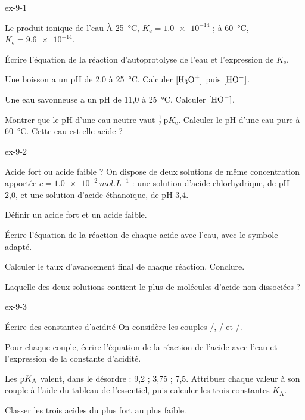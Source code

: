 \begin{blocLivre}{ex-9-1}
\begin{exercice}[1]{Le produit ionique de l'eau}
À 25~°C, $K_\mathrm{e}=\num{1.0e-14}$ ; à 60~°C, $K_\mathrm{e}=\num{9.6e-14}$.
\begin{questions}
\item Écrire l'équation de la réaction d'autoprotolyse de l'eau et l'expression de $K_\mathrm{e}$.
\item Une boisson a un pH de 2,0 à 25~°C. Calculer $[\ce{H3O+}]$ puis $[\ce{HO-}]$.
\item Une eau savonneuse a un pH de 11,0 à 25~°C. Calculer $[\ce{HO-}]$.
\item Montrer que le pH d'une eau neutre vaut $\frac12\,\mathrm{p}K_\mathrm{e}$. Calculer le pH d'une eau pure à 60~°C.
Cette eau est-elle acide ?
\end{questions}
\end{exercice}
\end{blocLivre}
\begin{blocLivre}{ex-9-2}
\begin{exercice}[1]{Acide fort ou acide faible ?}
On dispose de deux solutions de même concentration apportée $c=\qty{1,0e-2}{mol.L^{-1}}$ : une solution d'acide
chlorhydrique, de pH 2,0, et une solution d'acide éthanoïque, de pH 3,4.
\begin{questions}
\item Définir un acide fort et un acide faible.
\item Écrire l'équation de la réaction de chaque acide avec l'eau, avec le symbole adapté.
\item Calculer le taux d'avancement final de chaque réaction. Conclure.
\item Laquelle des deux solutions contient le plus de molécules d'acide non dissociées ?
\end{questions}
\end{exercice}
\end{blocLivre}
\begin{blocLivre}{ex-9-3}
\begin{exercice}[1]{Écrire des constantes d'acidité}
On considère les couples /, / et /.
\begin{questions}
\item Pour chaque couple, écrire l'équation de la réaction de l'acide avec l'eau et l'expression de la constante
d'acidité.
\item Les $\mathrm{p}K_{\mathrm{A}}$ valent, dans le désordre : 9,2 ; 3,75 ; 7,5. Attribuer chaque valeur à son couple à l'aide du tableau
de l'essentiel, puis calculer les trois constantes $K_\mathrm{A}$.
\item Classer les trois acides du plus fort au plus faible.
\end{questions}
\end{exercice}
\end{blocLivre}
